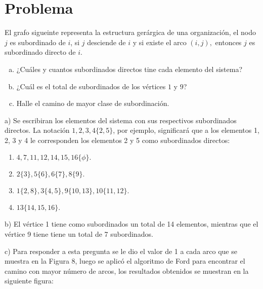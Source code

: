 \documentclass[autocontact]{gaceta}
\begin{document}
\section{Problema}
    El grafo sigueinte representa la estructura gerárgica de una organización, el nodo 
    $j$ es subordinado de $i$, si $j$ desciende de $i$ y si existe el arco $(i,j),$ entonces
    $j$ es subordinado directo de $i$.
    
    \begin{center}
        \begin{enumerate}[a)]
            \item ¿Cuáles y cuantos subordinados directos tine cada elemento del sistema?
            \item ¿Cuál es el total de subordinados de los vértices $1$ y $9$?
            \item Halle el camino de mayor clase de subordinación.
        \end{enumerate}        
    \end{center}

    

    \pagebreak

    a) Se escribiran los elementos del sistema con sus respectivos subordinados directos.
    La notación $1,2,3,4\{2,5\}$, por ejemplo, significará que a los elementos 1, 2, 3 y 4 le corresponden 
    los elementos 2 y 5 como subordinados directos:

    \begin{center}
        \begin{enumerate}
            \item $4,7,11,12,14,15,16\{\phi \}.$
            \item $2\{3\}, 5\{6\}, 6\{7\},  8\{9\}.$
            \item $1\{2,8\},  3\{4,5\},   9\{10,13\}, 10\{11,12\}.$
            \item $13\{14,15,16\}.$
        \end{enumerate}
    \end{center}

    b) El vértice 1 tiene como subordinados un total de 14 elementos, mientras que el vértice 9 tiene
    tiene un total de 7 subordinados.

    c) Para responder a esta pregunta se le dio el valor de 1 a cada arco que se muestra en la Figura 8,
    luego se aplicó el algoritmo de Ford para encontrar el camino con mayor número de arcos, los 
    resultados obtenidos se muestran en la siguiente figura:
\end{document}
